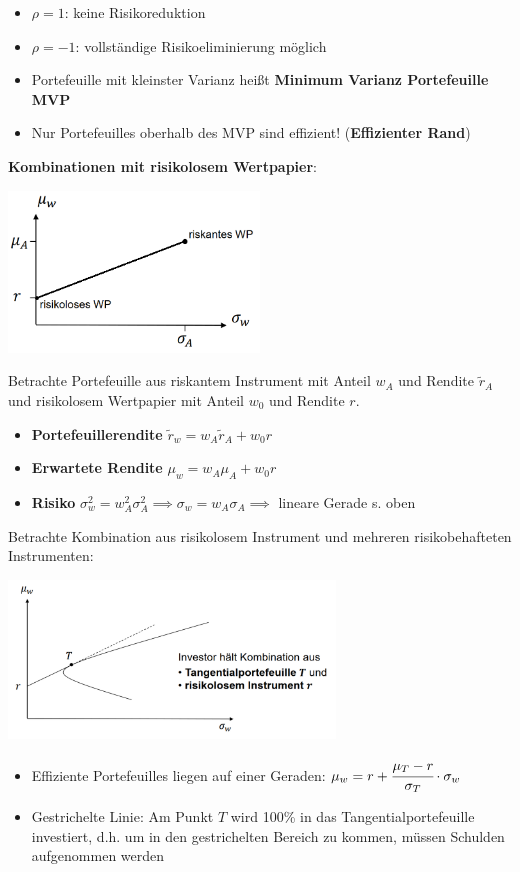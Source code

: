 \begin{itemize}
	\item $\rho=1$: keine Risikoreduktion
	\item $\rho=-1$: vollständige Risikoeliminierung möglich
	\item Portefeuille mit kleinster Varianz heißt \textbf{Minimum Varianz Portefeuille MVP}
	\item Nur Portefeuilles oberhalb des MVP sind effizient! (\textbf{Effizienter Rand})
\end{itemize}
\bigskip
\textbf{Kombinationen mit risikolosem Wertpapier}:
\begin{center}
	\includegraphics[width=0.5\textwidth]{images/riskfree.png}
\end{center}
Betrachte Portefeuille aus riskantem Instrument mit Anteil $w_A$ und Rendite $\tilde{r}_A$ und risikolosem Wertpapier mit Anteil $w_0$ und Rendite $r$.
\begin{itemize}
	\item \textbf{Portefeuillerendite} $\tilde{r}_w=w_A\tilde{r}_A+w_0r$
	\item \textbf{Erwartete Rendite} $\mu_w=w_A\mu_A+w_0r$
	\item \textbf{Risiko} $\sigma_w^2=w_A^2\sigma_A^2\implies\sigma_w=w_A\sigma_A\implies$ lineare Gerade s. oben
\end{itemize}
Betrachte Kombination aus risikolosem Instrument und mehreren risikobehafteten Instrumenten:
\begin{center}
	\includegraphics[width=0.65\textwidth]{images/r_and_r.png}
\end{center}
\begin{itemize}
	\item Effiziente Portefeuilles liegen auf einer Geraden: $\mu_w=r+\cfrac{\mu_T-r}{\sigma_T}\cdot\sigma_w$
	\item Gestrichelte Linie: Am Punkt $T$ wird 100\% in das Tangentialportefeuille investiert, d.h. um in den gestrichelten Bereich zu kommen, müssen Schulden aufgenommen werden
\end{itemize}
